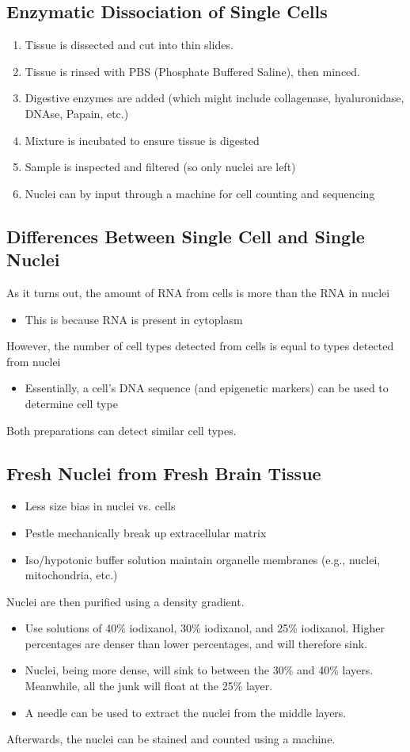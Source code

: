\documentclass[10pt]{article}
\begin{document}
\subsection*{Enzymatic Dissociation of Single Cells}
\begin{enumerate}
	\item Tissue is dissected and cut into thin slides.
	\item Tissue is rinsed with PBS (Phosphate Buffered Saline), then minced.
	\item Digestive enzymes are added (which might include collagenase, hyaluronidase, DNAse, Papain, etc.)
	\item Mixture is incubated to ensure tissue is digested
	\item Sample is inspected and filtered (so only nuclei are left)
	\item Nuclei can by input through a machine for cell counting and sequencing
\end{enumerate}

\subsection*{Differences Between Single Cell and Single Nuclei}
As it turns out, the amount of RNA from cells is more than the RNA in nuclei
\begin{itemize}
	\item This is because RNA is present in cytoplasm
\end{itemize}
However, the number of cell types detected from cells is equal to types detected from nuclei
\begin{itemize}
	\item Essentially, a cell's DNA sequence (and epigenetic markers) can be used to determine cell type
\end{itemize}
Both preparations can detect similar cell types.

\subsection*{Fresh Nuclei from Fresh Brain Tissue}
\begin{itemize}
	\item Less size bias in nuclei vs. cells
	\item Pestle mechanically break up extracellular matrix
	\item Iso/hypotonic buffer solution maintain organelle membranes (e.g., nuclei, mitochondria, etc.)
\end{itemize}
Nuclei are then purified using a density gradient.
\begin{itemize}
	\item Use solutions of 40\% iodixanol, 30\% iodixanol, and 25\% iodixanol.  Higher percentages are denser than lower percentages, and will therefore sink.
	\item Nuclei, being more dense, will sink to between the 30\% and 40\% layers.  Meanwhile, all the junk will float at the 25\% layer.
	\item A needle can be used to extract the nuclei from the middle layers.
\end{itemize}
Afterwards, the nuclei can be stained and counted using a machine.
\end{document}
